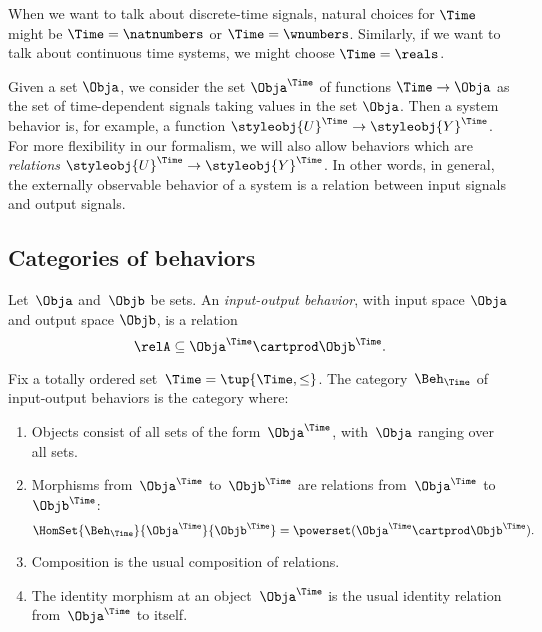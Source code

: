 {    When we want to talk about discrete-time signals, natural choices for $\Time$ might be $\Time = \natnumbers$ or $\Time = \wnumbers$.
    Similarly, if we want to talk about continuous time systems, we might choose $\Time = \reals$.

    Given a set $\Obja$, we consider the set $\Obja^\Time$ of functions $\Time \to \Obja$ as the set of time-dependent signals taking values in the set $\Obja$.
    Then a system behavior is, for example, a function $\styleobj{U}^\Time \to \styleobj{Y}^\Time$.
    For more flexibility in our formalism, we will also allow behaviors which are \emph{relations} $\styleobj{U}^\Time \to \styleobj{Y}^\Time$.
    In other words, in general, the externally observable behavior of a system is a relation between input signals and output signals.

    \subsection{Categories of behaviors}

    \begin{definition}
        Let~$\Obja$ and~$\Objb$ be sets.
        An \emph{input-output behavior}, with input space $\Obja$ and output space $\Objb$, is a relation
        \begin{equation*}
            \relA \subseteq \Obja^\Time \cartprod \Objb^\Time.
        \end{equation*}
    \end{definition}

    \begin{definition}
        Fix a totally ordered set~$\Time = \tup{\Time, \leq}$.
        The category~$\Beh_\Time$ of input-output behaviors is the category where:
        \begin{enumerate}
            \item Objects consist of all sets of the form~$\Obja^\Time$, with~$\Obja$ ranging over all sets.
            \item Morphisms from~$\Obja^\Time$ to~$\Objb^\Time$ are relations from~$\Obja^\Time$ to~$\Objb^\Time$:
                  \begin{equation}
                      \HomSet{\Beh_\Time}{\Obja^\Time}{\Objb^\Time} = \powerset (\Obja^\Time \cartprod \Objb^\Time).
                  \end{equation}
            \item Composition is the usual composition of relations.
            \item The identity morphism at an object~$\Obja^\Time$ is the usual identity relation from~$\Obja^\Time$ to itself.
        \end{enumerate}
    \end{definition}

}
